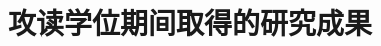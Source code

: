 \chapter*{攻读学位期间取得的研究成果}


\begin{enumerate}[{[}1{]}]

\item 

\item 
    
\item 
    
\item 
    
\end{enumerate}






